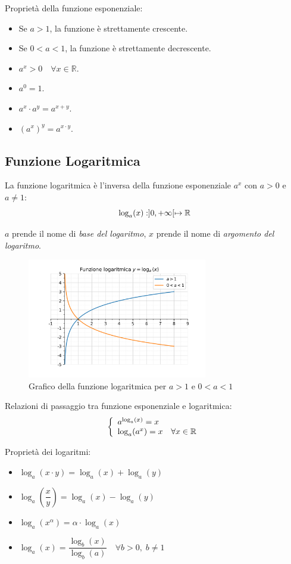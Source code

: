 Proprietà della funzione esponenziale:
\begin{itemize}
  \item Se $a > 1$, la funzione è strettamente crescente.
  \item Se $0 < a < 1$, la funzione è strettamente decrescente.
  \item $a^x > 0 \quad \forall x \in \mathbb{R}$.
  \item $a^0 = 1$.
  \item $a^x \cdot a^y = a^{x + y}$.
  \item $(a^x)^y = a^{x \cdot y}$.
\end{itemize}


\subsection{Funzione Logaritmica}

La funzione logaritmica è l'inversa della funzione esponenziale $a^x$ con $a > 0$ e $a \neq 1$:
\[
  \log_a(x): ]0, +\infty[ \mapsto \mathbb{R}
\]

$a$ prende il nome di \textit{base del logaritmo},  
$x$ prende il nome di \textit{argomento del logaritmo}.

\begin{figure}[H]
  \centering
  \includegraphics[width=0.7\textwidth]{./img/logaritmica.png}
  \caption{Grafico della funzione logaritmica per $a>1$ e $0<a<1$}
  \label{fig:funzione_logaritmica}
\end{figure}
\FloatBarrier

Relazioni di passaggio tra funzione esponenziale e logaritmica:
\[
\left\{
\begin{array}{l}
a^{\log_a(x)} = x \\
\log_a(a^x) = x \quad \forall x \in \mathbb{R}
\end{array}
\right.
\]

Proprietà dei logaritmi:
\begin{itemize}
  \item $\log_a(x \cdot y) = \log_a(x) + \log_a(y)$
  \item $\log_a\!\left(\dfrac{x}{y}\right) = \log_a(x) - \log_a(y)$
  \item $\log_a(x^{\alpha}) = \alpha \cdot \log_a(x)$
  \item $\log_a(x) = \dfrac{\log_b(x)}{\log_b(a)} \quad \forall b > 0, \; b \neq 1$
  \end{itemize}

